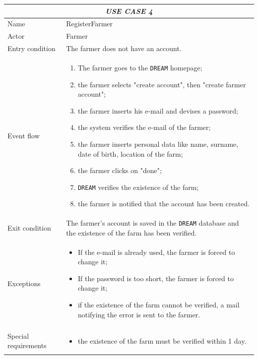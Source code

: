 \documentclass{article}
\begin{document}
\centering
\begin{tabular}{|p{3.5cm}|m{8cm}|}
 \hline
 \multicolumn{2}{|c|}{\emph{USE CASE 4}} \\
 \hline
 Name & RegisterFarmer\\
 \hline
 Actor & Farmer\\
 \hline
 Entry condition & The farmer does not have an account.\\
 \hline
 Event flow & \begin{enumerate}
    \item The farmer goes to the \verb|DREAM| homepage;
    \item the farmer selects "create account", then "create farmer account";
    \item the farmer inserts his e-mail and devises a password;
    \item the system verifies the e-mail of the farmer;
    \item the farmer inserts personal data like name, surname, date of birth, location of the farm;
    \item the farmer clicks on "done";
    \item \verb|DREAM| verifies the existence of the farm;
    \item the farmer is notified that the account has been created.
 \end{enumerate}\\
 \hline
 Exit condition & The farmer's account is saved in the \verb|DREAM| database and the existence of the farm has been verified.\\
 \hline
 Exceptions & \begin{itemize}
     \item If the e-mail is already used, the farmer is forced to change it;
     \item If the password is too short, the farmer is forced to change it;
     \item if the existence of the farm cannot be verified, a mail notifying the error is sent to the farmer.
 \end{itemize}\\
 \hline
 Special requirements & \begin{itemize}
     \item the existence of the farm must be verified within 1 day.
 \end{itemize}\\
 \hline
\end{tabular}
\end{document}
